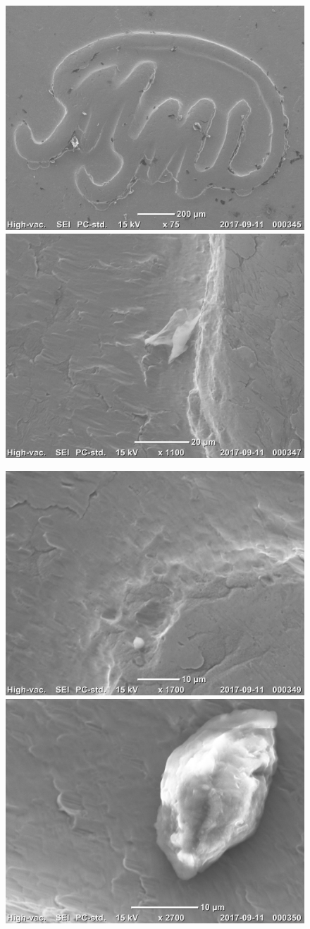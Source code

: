 \documentclass[12pt]{article}
\begin{document}
\begin{figure}[!ht]
\includegraphics[width=0.5\linewidth]{pictures/20170911_000345.jpg}
\includegraphics[width=0.5\linewidth]{pictures/20170911_000347.jpg}
\end{figure}

\begin{figure}[!ht]
\includegraphics[width=0.5\linewidth]{pictures/20170911_000349.jpg}
\includegraphics[width=0.5\linewidth]{pictures/20170911_000350.jpg}
\end{figure}
\end{document}
